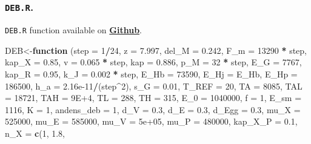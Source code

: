 \documentclass[]{article}
\newenvironment{Shaded}{\begin{snugshade}}{\end{snugshade}}
\newcommand{\KeywordTok}[1]{\textcolor[rgb]{0.13,0.29,0.53}{\textbf{#1}}}
\newcommand{\DataTypeTok}[1]{\textcolor[rgb]{0.13,0.29,0.53}{#1}}
\newcommand{\DecValTok}[1]{\textcolor[rgb]{0.00,0.00,0.81}{#1}}
\newcommand{\FloatTok}[1]{\textcolor[rgb]{0.00,0.00,0.81}{#1}}
\newcommand{\StringTok}[1]{\textcolor[rgb]{0.31,0.60,0.02}{#1}}
\newcommand{\ControlFlowTok}[1]{\textcolor[rgb]{0.13,0.29,0.53}{\textbf{#1}}}
\newcommand{\OperatorTok}[1]{\textcolor[rgb]{0.81,0.36,0.00}{\textbf{#1}}}
\newcommand{\NormalTok}[1]{#1}
\let\oldsubparagraph\subparagraph
\renewcommand{\subparagraph}[1]{\oldsubparagraph{#1}\mbox{}}
\begin{document}
\subparagraph{}\label{section-3}

\subsubsection{\texorpdfstring{\texttt{DEB.R}.}{DEB.R.}}\label{deb.r.}

\texttt{DEB.R} function available on
\href{https://github.com/darwinanddavis/MalishevBullKearney/blob/master/DEB.R}{\textbf{Github}}.

\begin{Shaded}
\begin{Highlighting}[]
\NormalTok{DEB<-}\ControlFlowTok{function}\NormalTok{ (}\DataTypeTok{step =} \DecValTok{1}\OperatorTok{/}\DecValTok{24}\NormalTok{, }\DataTypeTok{z =} \FloatTok{7.997}\NormalTok{, }\DataTypeTok{del_M =} \FloatTok{0.242}\NormalTok{, }\DataTypeTok{F_m =} \DecValTok{13290} \OperatorTok{*}\StringTok{ }
\StringTok{    }\NormalTok{step, }\DataTypeTok{kap_X =} \FloatTok{0.85}\NormalTok{, }\DataTypeTok{v =} \FloatTok{0.065} \OperatorTok{*}\StringTok{ }\NormalTok{step, }\DataTypeTok{kap =} \FloatTok{0.886}\NormalTok{, }\DataTypeTok{p_M =} \DecValTok{32} \OperatorTok{*}\StringTok{ }
\StringTok{    }\NormalTok{step, }\DataTypeTok{E_G =} \DecValTok{7767}\NormalTok{, }\DataTypeTok{kap_R =} \FloatTok{0.95}\NormalTok{, }\DataTypeTok{k_J =} \FloatTok{0.002} \OperatorTok{*}\StringTok{ }\NormalTok{step, }\DataTypeTok{E_Hb =} \DecValTok{73590}\NormalTok{, }
    \DataTypeTok{E_Hj =}\NormalTok{ E_Hb, }\DataTypeTok{E_Hp =} \DecValTok{186500}\NormalTok{, }\DataTypeTok{h_a =} \FloatTok{2.16e-11}\OperatorTok{/}\NormalTok{(step}\OperatorTok{^}\DecValTok{2}\NormalTok{), }\DataTypeTok{s_G =} \FloatTok{0.01}\NormalTok{, }
    \DataTypeTok{T_REF =} \DecValTok{20}\NormalTok{, }\DataTypeTok{TA =} \DecValTok{8085}\NormalTok{, }\DataTypeTok{TAL =} \DecValTok{18721}\NormalTok{, }\DataTypeTok{TAH =} \FloatTok{9E+4}\NormalTok{, }\DataTypeTok{TL =} \DecValTok{288}\NormalTok{, }
    \DataTypeTok{TH =} \DecValTok{315}\NormalTok{, }\DataTypeTok{E_0 =} \DecValTok{1040000}\NormalTok{, }\DataTypeTok{f =} \DecValTok{1}\NormalTok{, }\DataTypeTok{E_sm =} \DecValTok{1116}\NormalTok{, }\DataTypeTok{K =} \DecValTok{1}\NormalTok{, }\DataTypeTok{andens_deb =} \DecValTok{1}\NormalTok{, }
    \DataTypeTok{d_V =} \FloatTok{0.3}\NormalTok{, }\DataTypeTok{d_E =} \FloatTok{0.3}\NormalTok{, }\DataTypeTok{d_Egg =} \FloatTok{0.3}\NormalTok{, }\DataTypeTok{mu_X =} \DecValTok{525000}\NormalTok{, }\DataTypeTok{mu_E =} \DecValTok{585000}\NormalTok{, }
    \DataTypeTok{mu_V =} \FloatTok{5e+05}\NormalTok{, }\DataTypeTok{mu_P =} \DecValTok{480000}\NormalTok{, }\DataTypeTok{kap_X_P =} \FloatTok{0.1}\NormalTok{, }\DataTypeTok{n_X =} \KeywordTok{c}\NormalTok{(}\DecValTok{1}\NormalTok{, }\FloatTok{1.8}\NormalTok{, }

\end{Highlighting}
\end{Shaded}
\end{document}
